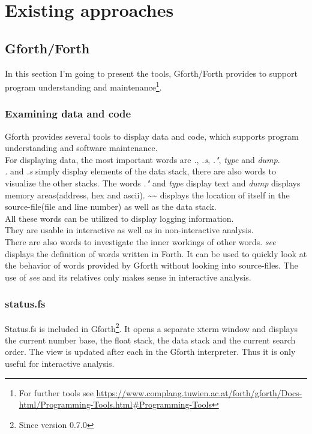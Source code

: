 \section{Existing approaches}

\subsection{Gforth/Forth}

In this section I'm going to present the tools, Gforth/Forth provides to support program understanding and maintenance\footnote{For further tools see \url{https://www.complang.tuwien.ac.at/forth/gforth/Docs-html/Programming-Tools.html\#Programming-Tools}}.

\subsubsection*{Examining data and code}
Gforth provides several tools to display data and code, which supports program understanding and software maintenance.\\
For displaying data, the most important words are \emph{.}, \emph{.s}, \emph{."}, \emph{type} and \emph{dump}.\\
\emph{.} and \emph{.s} simply display elements of the data stack, there are also words to visualize the other stacks.
The words \emph{."} and \emph{type} display text and \emph{dump} displays memory areas(address, hex and ascii).
\textasciitilde\textasciitilde\:  displays the location of itself in the source-file(file and line number) as well as the data stack.\\
All these words can be utilized to display logging information.\\
They are usable in interactive as well as in non-interactive analysis.\\
There are also words to investigate the inner workings of other words. 
\emph{see} displays the definition of words written in Forth. It can be used to quickly look at the behavior of words provided by Gforth without looking into source-files. The use of \emph{see} and its relatives only makes sense in interactive analysis.

\subsubsection*{status.fs}
Status.fs is included in Gforth\footnote{Since version 0.7.0}. It opens a separate xterm window and displays the current number base, the float stack, the data stack and the current search order. The view is updated after each \keys{\return} in the Gforth interpreter. Thus it is only useful for interactive analysis.

